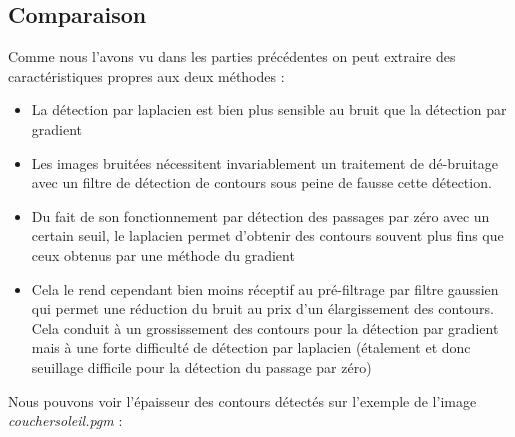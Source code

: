 \documentclass[a4,12pt]{article}
\begin{document}
\subsection{Comparaison}
Comme nous l'avons vu dans les parties précédentes on peut extraire des caractéristiques propres aux deux méthodes :
\begin{itemize}
	\item La détection par laplacien est bien plus sensible au bruit que la détection par gradient
	\item Les images bruitées nécessitent invariablement un traitement de dé-bruitage avec un filtre de détection de contours sous peine de fausse cette détection.
	\item Du fait de son fonctionnement par détection des passages par zéro avec un certain seuil, le laplacien permet d'obtenir des contours souvent plus fins que ceux obtenus par une méthode du gradient
	\item Cela le rend cependant bien moins réceptif au pré-filtrage par filtre gaussien qui permet une réduction du bruit au prix d'un élargissement des contours. Cela conduit à un grossissement des contours pour la détection par gradient mais à une forte difficulté de détection par laplacien (étalement et donc seuillage difficile pour la détection du passage par zéro)\\
\end{itemize}

Nous pouvons voir l'épaisseur des contours détectés sur l'exemple de l'image \textit{couchersoleil.pgm} :
\end{document}
